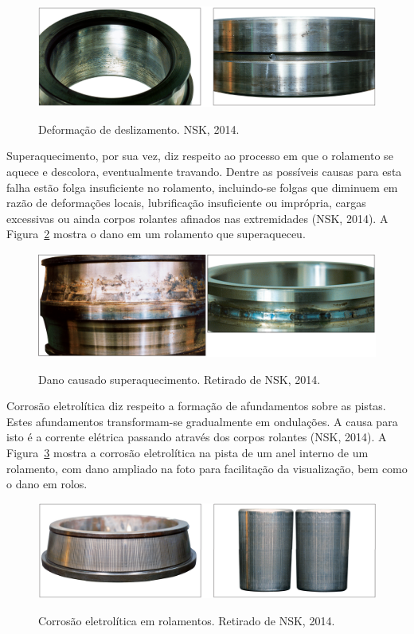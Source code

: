 \documentclass[
	12pt,				
	oneside,			
	a4paper,			
	english,			
	brazil,			
	]{abntex2ppgsi}
\begin{document}
\begin{figure}[H]
\centering
\caption {Deformação de deslizamento. NSK, 2014.}
\includegraphics[width=\textwidth,height=\textheight,keepaspectratio]{deslizamento_nsk}
\label{deslizamento_nsk}
\end{figure}

Superaquecimento, por sua vez, diz respeito ao processo em que o rolamento se aquece e descolora, eventualmente travando. Dentre as possíveis causas para esta falha estão folga insuficiente no rolamento, incluindo-se folgas que diminuem em razão de deformações locais, lubrificação insuficiente ou imprópria, cargas excessivas ou ainda corpos rolantes afinados nas extremidades (NSK, 2014). A Figura~\ref{superaquecimento_nsk} mostra o dano em um rolamento que superaqueceu.

\begin{figure}[H]
\centering
\caption {Dano causado superaquecimento. Retirado de NSK, 2014.}
\includegraphics[width=\textwidth,height=\textheight,keepaspectratio]{superaquecimento_nsk}
\label{superaquecimento_nsk}
\end{figure}

Corrosão eletrolítica diz respeito a formação de afundamentos sobre as pistas. Estes afundamentos transformam-se gradualmente em ondulações. A causa para isto é a corrente elétrica passando através dos corpos rolantes (NSK, 2014). A Figura~\ref{corrosao_eletrolitica_nsk} mostra a corrosão eletrolítica na pista de um anel interno de um rolamento, com dano ampliado na foto para facilitação da visualização, bem como o dano em rolos. 

\begin{figure}[H]
\centering
\caption {Corrosão eletrolítica em rolamentos. Retirado de NSK, 2014.}
\includegraphics[width=\textwidth,height=\textheight,keepaspectratio]{corrosao_eletrolitica_nsk}
\label{corrosao_eletrolitica_nsk}
\end{figure}
\end{document}
